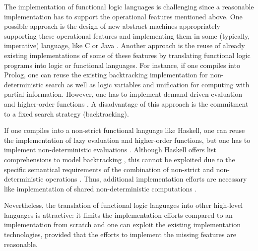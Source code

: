 \documentclass{llncs}
\begin{document}
The implementation of functional logic languages is challenging
since a reasonable implementation has to support the operational
features mentioned above.
One possible approach
is the design of new abstract machines appropriately supporting
these operational features and implementing them in some (typically,
imperative) language, like C \cite{Lux99FLOPS}
or Java \cite{AntoyHanusLiuTolmach05,HanusSadre99JFLP}.
Another approach is the reuse of already existing implementations
of some of these features by translating
functional logic programs into logic or functional languages.
For instance, if one compiles into Prolog, one can reuse
the existing backtracking implementation for non-deterministic
search as well as logic variables and unification for computing with partial
information. However, one has to implement demand-driven evaluation
and higher-order functions \cite{AntoyHanus00FROCOS}.
A disadvantage of this approach is the commitment to a fixed
search strategy (backtracking).

If one compiles into a non-strict functional language like Haskell,
one can reuse the implementation
of lazy evaluation and higher-order functions, but one has
to implement non-deterministic evaluations
\cite{BrasselFischerHanusReck11,BrasselHuch07}.
Although Haskell offers list comprehensions to model
backtracking \cite{Wadler85}, this cannot be exploited
due to the specific semantical requirements of the combination
of non-strict and non-deterministic operations
\cite{GonzalezEtAl99}. Thus, additional implementation efforts
are necessary like implementation of shared
non-deterministic computations \cite{FischerKiselyovShan09}.

Nevertheless, the translation of functional logic languages
into other high-level languages is attractive:
it limits the implementation efforts compared to an implementation
from scratch and one can exploit the existing implementation technologies,
provided that the efforts to implement the missing features
are reasonable.
\end{document}
